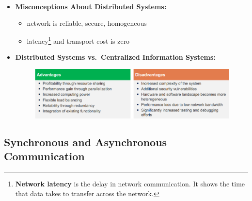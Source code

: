 \documentclass[ieeetran]{article}
\begin{document}
\begin{itemize}
\item \textbf{Misconceptions About Distributed Systems:}
	\begin{itemize}
	  \item network is reliable, secure, homogeneous
	\item latency\footnote{\textbf{Network latency} is the delay in network communication. It shows the time that data takes to transfer across the network.} and transport  cost is zero
	\end{itemize}

\item \textbf{Distributed Systems vs.\ Centralized Information Systems:}
	\begin{figure}[h!]
	  \centering
	  \includegraphics[width=1.0\linewidth]{centdecent.png}
	  \label{fig:centdecent_png}
	\end{figure}
\end{itemize}

\subsection{Synchronous and Asynchronous Communication} %
\label{sub:synchronous_and_asynchronous_communication}
\end{document}
